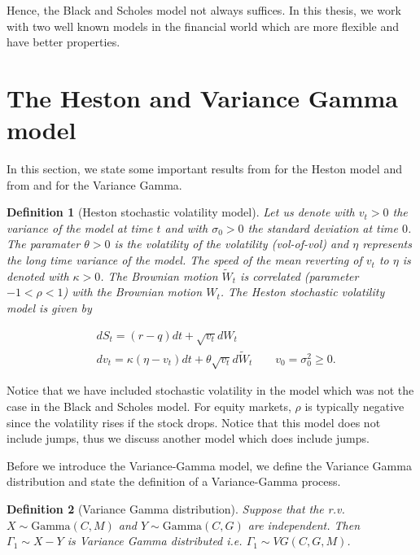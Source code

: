 \documentclass[12pt,a4paper,oneside]{book}
\newtheorem{Definition}{Definition}
\begin{document}
Hence, the Black and Scholes model not always suffices. In this thesis, we work with two well known models in the financial world which are more flexible and have better properties. 

\section{The Heston and Variance Gamma model}

In this section, we state some important results from \cite{heston1993closed} for the Heston model and from \cite{madan1998variance} and \cite{wimschoutensvg} for the Variance Gamma. 

\begin{Definition}[Heston stochastic volatility model]
Let us denote with $v_t>0$ the variance of the model at time $t$ and with $\sigma_0>0$ the standard deviation at time $0$. The paramater $\theta>0$ is the volatility of the volatility (vol-of-vol) and $\eta$ represents the long time variance of the model. The speed of the mean reverting of $v_t$ to $\eta$ is denoted with $\kappa>0$. The Brownian motion $\tilde{W}_t $ is correlated (parameter $-1<\rho<1$) with the Brownian motion $W_t $. The Heston stochastic volatility model is given by

\begin{equation}
\begin{aligned}
&dS_t = (r-q) dt + \sqrt{v_t} dW_t \\
&dv_t = \kappa (\eta - v_t) dt + \theta \sqrt{v_t} d \tilde{W}_t   \qquad v_0 = \sigma_0^2 \geq 0.
\end{aligned}
\end{equation}
\end{Definition}


Notice that we have included stochastic volatility in the model which was not the case in the Black and Scholes model. For equity markets, $\rho$ is typically negative since the volatility rises if the stock drops. Notice that this model does not include jumps, thus we discuss another model which does include jumps. 

Before we introduce the Variance-Gamma model, we define the Variance Gamma distribution and state the definition of a Variance-Gamma process.

\begin{Definition}[Variance Gamma distribution]
Suppose that the r.v. $X \sim \text{Gamma}(C,M)$ and $Y \sim \text{Gamma}(C,G)$ are independent. Then $\Gamma_1 \sim X-Y$ is Variance Gamma distributed i.e.  $\Gamma_1 \sim VG(C,G,M)$. 
\end{Definition}
\end{document}
